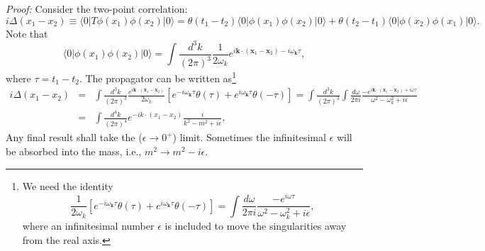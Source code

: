 \documentclass[aps,prb,superscriptaddress,nofootinbib]{revtex4}
\begin{document}
\noindent\textit{Proof:}
Consider the two-point correlation:
\begin{equation}
	i\Delta(x_1-x_2) \equiv \langle 0|T \phi(x_1) \phi(x_2) |0\rangle 
	= \theta(t_1-t_2) \langle 0|\phi(x_1) \phi(x_2) |0\rangle 
	+ \theta(t_2-t_1) \langle 0|\phi(x_2) \phi(x_1) |0\rangle.
\end{equation}
Note that
\begin{equation}
	\langle 0|\phi(x_1) \phi(x_2) |0\rangle
	= \int\frac{d^{3} k}{(2\pi)^{3}}\frac{1}{2\omega_k} e^{i\bm k\cdot (\bm x_1-\bm x_2)-i\omega_{\bm k}\tau},
\end{equation}
where $\tau =t_1-t_2$.
The propagator can be written as\footnote{We need the identity
\begin{equation*}
	\frac{1}{2\omega_k} \left[e^{-i\omega_{\bm k}\tau}\theta(\tau)+e^{i\omega_{\bm k}\tau}\theta(-\tau)\right] 
	= \int \frac{d\omega}{2\pi i} \frac{-e^{i\omega\tau}}{\omega^2-\omega_k^2+i\epsilon},
\end{equation*}
where an infinitesimal number $\epsilon$ is included to move the singularities away from the real axis.}
\begin{eqnarray}
	i\Delta(x_1-x_2) 
	&=& \int\frac{d^{3} k}{(2\pi)^{3}}\frac{e^{i\bm k\cdot (\bm x_1-\bm x_2)}}{2\omega_k} \left[e^{-i\omega_{\bm k}\tau}\theta(\tau)+e^{i\omega_{\bm k}\tau}\theta(-\tau)\right] 
	= \int\frac{d^{3} k}{(2\pi)^{3}} \int \frac{d\omega}{2\pi i}\frac{-e^{i\bm k\cdot (\bm x_1-\bm x_2)+i\omega\tau}}{\omega^2-\omega_k^2+i\epsilon} \nonumber\\
	&=& \int\frac{d^{4} k}{(2\pi)^{4}} e^{-i k\cdot (x_1-x_2)}\frac{i}{k^2-m^2+i\epsilon},
\end{eqnarray}
Any final result shall take the ($\epsilon \rightarrow 0^+$) limit.
Sometimes the infinitesimal $\epsilon$ will be absorbed into the mass, i.e., $m^2 \rightarrow m^2-i\epsilon$.
\end{document}
